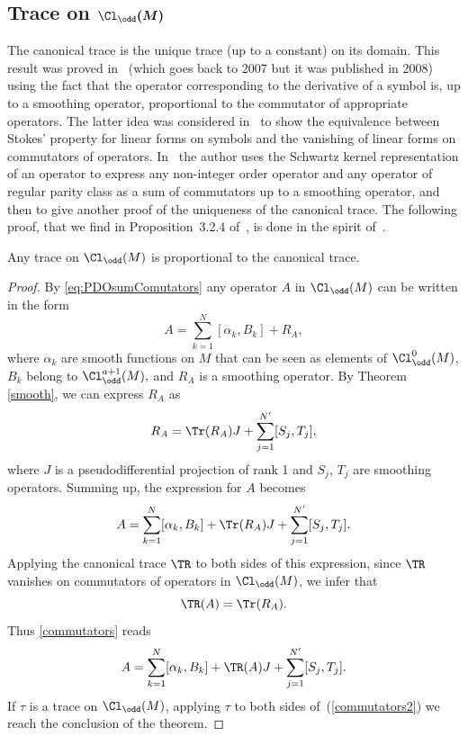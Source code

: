 \subsection[Trace on $\Cl_{\odd}(M)$]{Trace on $\boldsymbol{\Cl_{\odd}(M)}$}

The canonical trace is the unique trace (up to a constant) on its domain. This result was proved in~\cite{maniccia} (which goes back to 2007 but it was published in 2008) using the fact that the operator corresponding to the derivative of a symbol is, up to a smoothing operator, proportional to the commutator of appropriate operators. The latter idea was considered in~\cite{sylvie} to show the equivalence between Stokes' property for linear forms on symbols and the vanishing of linear forms on commutators of operators. In~\cite{ponge} the author uses the Schwartz kernel representation of an operator to express any non-integer order operator and any operator of regular parity class as a sum of commutators up to a smoothing operator, and then to give another proof of the uniqueness of the canonical trace. The following proof, that we f\/ind in Proposition~3.2.4 of~\cite{ouedraogothese}, is done in the spirit of~\cite{maniccia}.

\begin{theorem}\label{prop:UniquenessTrace}
Any trace on $\Cl_{\odd}(M)$ is proportional to the canonical trace.
\end{theorem}

\begin{proof}
By \eqref{eq:PDOsumComutators} any operator $A$ in $\Cl_{\odd}(M)$ can be written in the form
\[
A=\sum\limits_{k=1}^{N}[\alpha_k,B_k]+R_A,
\]
where $\alpha_k$ are smooth functions on $M$ that can be seen as elements of $\Cl^0_{\odd}(M)$, $B_k$ belong to $\Cl^{a+1}_{\odd}(M),$ and $R_A$ is a smoothing operator.
By Theorem \ref{smooth}, we can express $R_A$ as
\[
R_A=\Tr(R_A)J+\sum_{j=1}^{N'}[S_j,T_j],
\]
where $J$ is a pseudodif\/ferential projection of rank 1 and $S_j$, $T_j$ are smoothing operators. Summing up, the expression for $A$ becomes
\begin{gather}
A=\sum\limits_{k=1}^{N}[\alpha_k,B_k]+\Tr(R_A)J+\sum_{j=1}^{N'}[S_j,T_j]. \label{commutators}
\end{gather}
Applying the canonical trace $\TR$ to both sides of this expression, since $\TR$ vanishes on commutators of operators in $\Cl_{\odd}(M)$, we infer that
\[
\TR(A)=\Tr(R_A).
\]
Thus \eqref{commutators} reads
\begin{gather}
A=\sum\limits_{k=1}^{N}[\alpha_k,B_k]+\TR(A)J+\sum_{j=1}^{N'}[S_j,T_j]. \label{commutators2}
\end{gather}
If $\tau$ is a trace on $\Cl_{\odd}(M)$, applying $\tau$ to both sides of~(\ref{commutators2}) we reach the conclusion of the theorem.
\end{proof}
